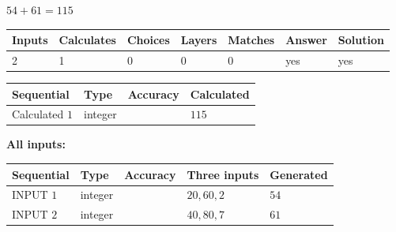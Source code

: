 \documentclass[12pt]{article}
\begin{document}
 
\noindent{}
 
 

$ %
54 +  %
61=   %
115$
 
 
\noindent{}
 
 

 
   
   
   
   
\noindent\begin{tabular}{|l|l|l|l|l|l|l|}
 \hline
Inputs & Calculates & Choices & Layers & Matches & Answer & Solution \\ \hline
 2  & 
 1  & 
 0
  & 
 0  & 
 0  & 
  yes & 
  yes 
  \\ \hline
 \end{tabular}
   
   
   
   
\noindent{}
   
   
  
  
\noindent\begin{tabular}{|l|l|l|l|}
\hline
 Sequential & Type & Accuracy & Calculated \\ 
\hline
 
 
  Calculated $  1 $ & integer &  & 
  $ 115 $ 
 \\  \hline  
 \end{tabular}
   
   
   
   
\noindent\vspace{0.1in}\hspace{-0.08in} {\textbf{\Large{All inputs: }}}
   
   
  
  
\noindent\begin{tabular}{|l|l|l|l|l|}
\hline
 Sequential & Type & Accuracy & Three inputs & Generated \\ 
\hline
 
 
  INPUT $  1 $ & integer &  & $
 20
 , 
 60
 , 
 2
 $ & $ 54 $ 
 \\  \hline  
 
 
  INPUT $  2 $ & integer &  & $
 40
 , 
 80
 , 
 7
 $ & $ 61 $ 
 \\  \hline  
 \end{tabular}
   
   
  
\end{document}
